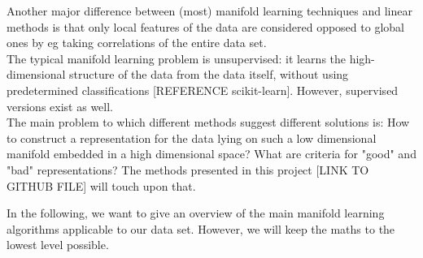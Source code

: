\documentclass[journal, a4paper]{IEEEtran}
\begin{document}
Another major difference between (most) manifold learning techniques and linear methods is that only local features of the data are considered opposed to global ones by eg taking correlations of the entire data set.\\

The typical manifold learning problem is unsupervised: it learns the high-dimensional structure of the data from the data itself, without using predetermined classifications [REFERENCE scikit-learn]. However, supervised versions exist as well.\\

The main problem to which different methods suggest different solutions is: How to construct a representation for the data lying on such a low dimensional manifold embedded in a high dimensional space? What are criteria for "good" and "bad" representations? The methods presented in this project [LINK TO GITHUB FILE] will touch upon that.





In the following, we want to give an overview of the main manifold learning algorithms applicable to our data set. However, we will keep the maths to the lowest level possible.

\end{document}
